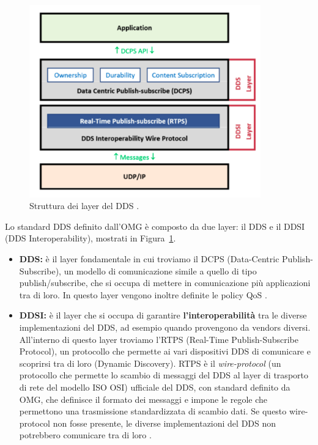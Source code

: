 \begin{figure}[H]
    \centering
    \includegraphics[width=10cm, keepaspectratio]{img/dcpsrtpslayers.png}
    \caption{Struttura dei layer del DDS \cite{4753364}.}
    \label{dcpsrtpslayers}
\end{figure}



Lo standard DDS definito dall'OMG è composto da due layer: 
il DDS e il
DDSI (DDS Interoperability), mostrati in Figura~\ref{dcpsrtpslayers}.
    \begin{itemize}
        \item \textbf{DDS:} è il layer fondamentale in cui troviamo il DCPS
        (Data-Centric Publish-Subscribe),
        un modello di comunicazione simile a quello di tipo publish/subscribe,
        che si occupa di mettere in comunicazione più applicazioni 
        tra di loro. In questo layer vengono inoltre 
        definite le policy QoS \cite{Michaud2017Apr}.
        \item \textbf{DDSI:} è il layer che si occupa di garantire \textbf{l'interoperabilità}
        tra le diverse implementazioni del DDS, ad
        esempio quando provengono da vendors diversi.
        All'interno di questo layer troviamo l'RTPS 
        (Real-Time Publish-Subscribe Protocol), un protocollo che permette ai 
        vari dispositivi DDS di comunicare e scoprirsi tra di loro
        (Dynamic Discovery).
        RTPS è il \textit{wire-protocol} (un protocollo che permette lo scambio di 
        messaggi del DDS al layer di trasporto di rete 
        del modello ISO OSI) ufficiale del DDS, 
        con standard definito da OMG,
        che definisce il formato dei messaggi e impone le regole che 
        permettono una trasmissione standardizzata di scambio dati. 
        Se questo wire-protocol non fosse presente,
        le diverse implementazioni del DDS non potrebbero 
        comunicare tra di loro \cite{essay93639}.
    \end{itemize} 



